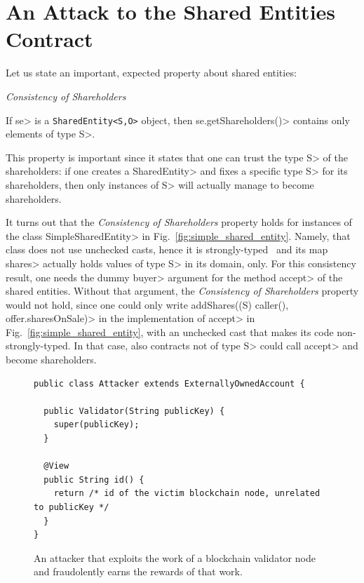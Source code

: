 \section{An Attack to the Shared Entities Contract}\label{sec:attack}

Let us state an important, expected property about shared entities:
%
\vspace{2ex}
\begin{mdframed}[leftmargin=10pt,rightmargin=10pt]
  \begin{center}\emph{Consistency of Shareholders}\end{center}
  \noindent
  If \<se> is a {\codesize\texttt{SharedEntity<S,O>} object,}
  then \<se.getShareholders()> contains only elements of type \<S>.
\end{mdframed}
\vspace{2ex}
%
This property is important since it states that one can trust the type \<S> of
the shareholders: if one creates a \<SharedEntity> and fixes a specific type \<S>
for its shareholders, then only instances of \<S> will actually manage to become shareholders.

It turns out that the \emph{Consistency of Shareholders} property holds
for instances of the class \<SimpleSharedEntity> in Fig.~\ref{fig:simple_shared_entity}.
Namely, that class does not use unchecked casts, hence it is strongly-typed~\cite{NaftalinW06} and
its map \<shares> actually holds values of type \<S> in its domain, only.
For this consistency result, one needs
the dummy \<buyer> argument for the method \<accept>
of the shared entities. Without that argument, the
\emph{Consistency of Shareholders} property would not hold, since one could only write
\<addShares((S) caller(), offer.sharesOnSale)> in the implementation of \<accept> in
Fig.~\ref{fig:simple_shared_entity}, with an unchecked cast that makes its code
non-strongly-typed. In that case, also contracts not of type \<S> could call \<accept>
and become shareholders.

\begin{figure}[ht]
  \begin{center}
    \begin{lstlisting}[language=Takamaka]
public class Attacker extends ExternallyOwnedAccount {

  public Validator(String publicKey) {
    super(publicKey);
  }

  @View
  public String id() {
    return /* id of the victim blockchain node, unrelated to publicKey */
  }
}
    \end{lstlisting}
  \end{center}
  \caption{An attacker that exploits the work of a blockchain validator node and fraudolently earns the rewards of that work.}\label{fig:attacker}
\end{figure}

